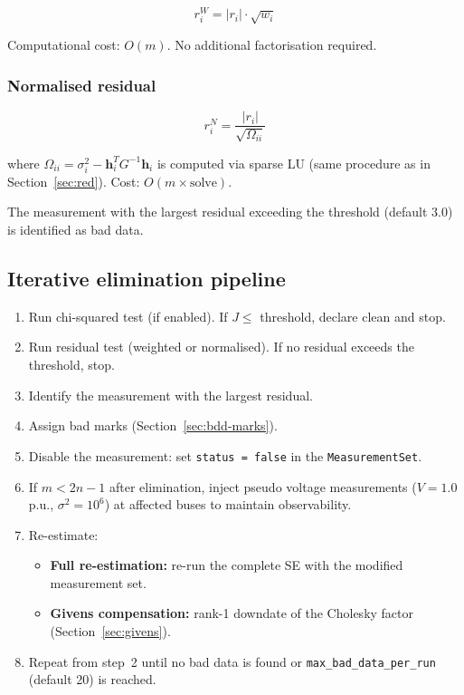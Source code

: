 \documentclass[11pt,a4paper]{article}
\begin{document}
\begin{equation}
  r_i^W = |r_i| \cdot \sqrt{w_i}
\end{equation}

Computational cost: $O(m)$.  No additional factorisation required.

\subsubsection{Normalised residual}

\begin{equation}
  r_i^N = \frac{|r_i|}{\sqrt{\Omega_{ii}}}
\end{equation}

\noindent
where $\Omega_{ii} = \sigma_i^2 - \mathbf{h}_i^T G^{-1} \mathbf{h}_i$
is computed via sparse LU (same procedure as in
Section~\ref{sec:red}).  Cost: $O(m \times \text{solve})$.

\medskip\noindent
The measurement with the largest residual exceeding the threshold
(default 3.0) is identified as bad data.

\subsection{Iterative elimination pipeline}\label{sec:bdd-iter}

\begin{enumerate}
  \item Run chi-squared test (if enabled).  If $J \le$ threshold, declare
        clean and stop.
  \item Run residual test (weighted or normalised).  If no residual
        exceeds the threshold, stop.
  \item Identify the measurement with the largest residual.
  \item Assign bad marks (Section~\ref{sec:bdd-marks}).
  \item Disable the measurement: set \texttt{status = false} in the
        \texttt{MeasurementSet}.
  \item If $m < 2n{-}1$ after elimination, inject pseudo voltage
        measurements ($V = 1.0$\,p.u., $\sigma^2 = 10^6$) at affected
        buses to maintain observability.
  \item Re-estimate:
    \begin{itemize}
      \item \textbf{Full re-estimation:} re-run the complete SE with the
            modified measurement set.
      \item \textbf{Givens compensation:} rank-1 downdate of the Cholesky
            factor (Section~\ref{sec:givens}).
    \end{itemize}
  \item Repeat from step~2 until no bad data is found or
        \texttt{max\_bad\_data\_per\_run} (default 20) is reached.
\end{enumerate}
\end{document}
